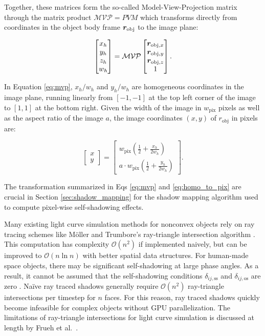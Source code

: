 Together, these matrices form the so-called Model-View-Projection matrix through the matrix product $\mathcal{MVP} = PVM$ which transforms directly from coordinates in the object body frame $\bm{r}_\mathrm{obj}$ to the image plane:

\begin{equation} \label{eq:mvp}
  \begin{bmatrix} x_h \\ y_h \\ z_h \\w_h \end{bmatrix} = \mathcal{MVP} \begin{bmatrix} \bm{r}_{\mathrm{obj},x} \\ \bm{r}_{\mathrm{obj},y} \\ \bm{r}_{\mathrm{obj},z} \\ 1 \end{bmatrix}.
\end{equation}

In Equation \ref{eq:mvp}, $x_h/w_h$ and $y_h/w_h$ are homogeneous coordinates in the image plane, running linearly from $[-1, -1]$ at the top left corner of the image to $[1, 1]$ at the bottom right. Given the width of the image in $w_\mathrm{pix}$ pixels as well as the aspect ratio of the image $a$, the image coordinates $\left(x,y\right)$ of $r_\mathrm{obj}$ in pixels are:

\begin{equation} \label{eq:homo_to_pix}
  \begin{bmatrix} x \\ y \end{bmatrix} = \begin{bmatrix} w_\mathrm{pix} \left(\frac{1}{2} + \frac{x_h}{2w_h}\right) \\ a \cdot w_\mathrm{pix}\left(\frac{1}{2} + \frac{y_h}{2w_h}\right) \end{bmatrix}.
\end{equation}

The transformation summarized in Eqs \ref{eq:mvp} and \ref{eq:homo_to_pix} are crucial in Section \ref{sec:shadow_mapping} for the shadow mapping algorithm used to compute pixel-wise self-shadowing effects.

Many existing light curve simulation methods for nonconvex objects rely on ray tracing schemes like Möller and Trumbore's ray-triangle intersection algorithm \cite{moller2005,fan2020thesis}. This computation has complexity $\mathcal{O}(n^2)$ if implemented naively, but can be improved to $\mathcal{O}(n \ln n)$ with better spatial data structures. For human-made space objects, there may be significant self-shadowing at large phase angles. As a result, it cannot be assumed that the self-shadowing conditions $\delta_{ij,\text{ss}}$ and $\delta_{ij,\text{os}}$ are zero \cite{frueh2014,fan2020thesis}. Naïve ray traced shadows generally require $\mathcal{O}(n^2)$ ray-triangle intersections per timestep for $n$ faces. For this reason, ray traced shadows quickly become infeasible for complex objects without GPU parallelization. The limitations of ray-triangle intersections for light curve simulation is discussed at length by Frueh et al.\ \cite{frueh2014}.

